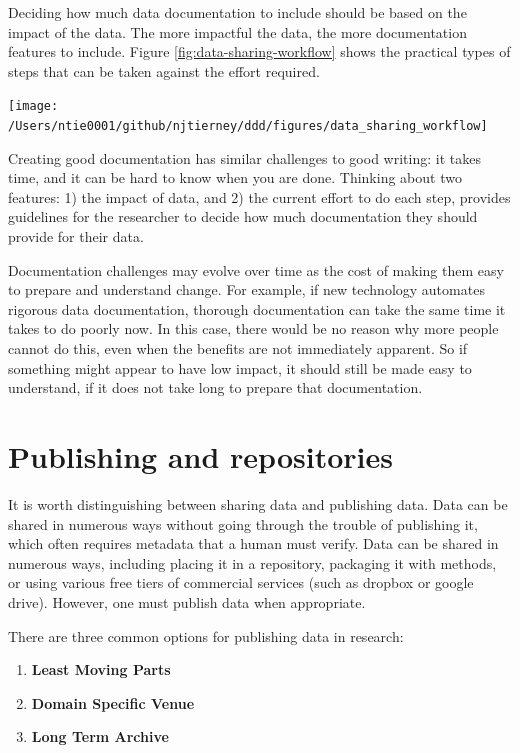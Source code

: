 \documentclass[
]{article}
\providecommand{\tightlist}{%
  \setlength{\itemsep}{0pt}\setlength{\parskip}{0pt}}
\let\origfigure\figure
\let\endorigfigure\endfigure
\renewenvironment{figure}[1][2] {
    \expandafter\origfigure\expandafter[H]
} {
    \endorigfigure
}
\begin{document}
Deciding how much data documentation to include should be based on the impact of the data. The more impactful the data, the more documentation features to include. Figure \ref{fig:data-sharing-workflow} shows the practical types of steps that can be taken against the effort required.

\begin{figure}
\texttt{[image: /Users/ntie0001/github/njtierney/ddd/figures/data\_sharing\_workflow]} \caption{The steps required compared to effort required for data sharing for reproducibility.}\label{fig:data-sharing-workflow}
\end{figure}

Creating good documentation has similar challenges to good writing: it takes time, and it can be hard to know when you are done. Thinking about two features: 1) the impact of data, and 2) the current effort to do each step, provides guidelines for the researcher to decide how much documentation they should provide for their data.

Documentation challenges may evolve over time as the cost of making them easy to prepare and understand change. For example, if new technology automates rigorous data documentation, thorough documentation can take the same time it takes to do poorly now. In this case, there would be no reason why more people cannot do this, even when the benefits are not immediately apparent. So if something might appear to have low impact, it should still be made easy to understand, if it does not take long to prepare that documentation.

\hypertarget{publish-repos}{%
\section{Publishing and repositories}\label{publish-repos}}

It is worth distinguishing between sharing data and publishing data. Data can be shared in numerous ways without going through the trouble of publishing it, which often requires metadata that a human must verify. Data can be shared in numerous ways, including placing it in a repository, packaging it with methods, or using various free tiers of commercial services (such as dropbox or google drive). However, one must publish data when appropriate.

There are three common options for publishing data in research:

\begin{enumerate}
\def\labelenumi{\arabic{enumi}.}
\tightlist
\item
  \textbf{Least Moving Parts}
\item
  \textbf{Domain Specific Venue}
\item
  \textbf{Long Term Archive}
\end{enumerate}
\end{document}
